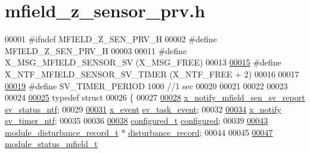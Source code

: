 \hypertarget{a00027_source}{\section{mfield\+\_\+z\+\_\+sensor\+\_\+prv.\+h}
\label{a00027_source}
}

\begin{DoxyCode}
00001 \textcolor{preprocessor}{#ifndef MFIELD\_Z\_SEN\_PRV\_H}
00002 \textcolor{preprocessor}{#define MFIELD\_Z\_SEN\_PRV\_H}
00003 
00011 \textcolor{preprocessor}{#define X\_MSG\_MFIELD\_SENSOR\_SV                      (X\_MSG\_FREE)}
00013 
\hypertarget{a00027_source_l00015}{}\hyperlink{a00027_ad9eede821e7c65d58f1806af4bd6bf29}{00015} \textcolor{preprocessor}{#define X\_NTF\_MFIELD\_SENSOR\_SV\_TIMER                                (X\_NTF\_FREE + 2)}
00016 
00017 
\hypertarget{a00027_source_l00019}{}\hyperlink{a00027_a8a535456285f4602701c814d7b69cc68}{00019} \textcolor{preprocessor}{#define SV\_TIMER\_PERIOD                             1000  //1 sec}
00020 
00021 
00022 
00023 
00024 
\hypertarget{a00027_source_l00025}{}\hyperlink{a00027}{00025} \textcolor{keyword}{typedef} \textcolor{keyword}{struct}
00026 \{
00027 
\hypertarget{a00027_source_l00028}{}\hyperlink{a00027_a752b00333ec308e07c6bd41aa9a01e73}{00028}        \hyperlink{a00019_dc/d41/a00862}{x\_notify\_mfield\_sen\_sv\_report}             
      \hyperlink{a00027_a752b00333ec308e07c6bd41aa9a01e73}{sv\_status\_ntf};
00029 
\hypertarget{a00027_source_l00031}{}\hyperlink{a00027_a43c345f39ea3aefbb60ef1ef57fe5d83}{00031}       \hyperlink{a00036_de/d37/a00849}{x\_event}                         \hyperlink{a00027_a43c345f39ea3aefbb60ef1ef57fe5d83}{sv\_task\_event};
00032 
\hypertarget{a00027_source_l00034}{}\hyperlink{a00027_ada91b200053f2d93e3639dc4ee3415b4}{00034}       \hyperlink{a00036_df/d4c/a00851}{x\_notify}                                   \hyperlink{a00027_ada91b200053f2d93e3639dc4ee3415b4}{sv\_timer\_ntf};
00035 
00036 
\hypertarget{a00027_source_l00038}{}\hyperlink{a00027_a94b2d1f6ea4ab334c74d24984dd27843}{00038}       \hyperlink{a00021_d6/d9c/a00352}{configured\_t}                               \hyperlink{a00027_a94b2d1f6ea4ab334c74d24984dd27843}{configured};
00039 
\hypertarget{a00027_source_l00043}{}\hyperlink{a00027_ac9b38e2c1d3f1013a88d33506c754152}{00043}       \hyperlink{a00028}{module\_disturbance\_record\_t}                *
      \hyperlink{a00027_ac9b38e2c1d3f1013a88d33506c754152}{disturbance\_record};
00044 
00045 
\hypertarget{a00027_source_l00047}{}\hyperlink{a00027_adfab5a5d8b45a93dfb13edb24e2b80e3}{00047}       \hyperlink{a00019_d6/db2/a00601}{module\_status\_mfield\_t}                     

\end{DoxyCode}
